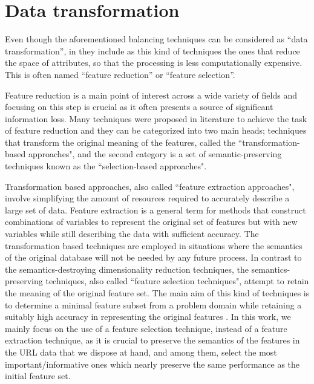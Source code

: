 \section{Data transformation}

Even though the aforementioned balancing techniques can be considered as ``data transformation'', in \cite{fayyad1996data} they include as this kind of techniques the ones that reduce the space of attributes, so that the processing is less computationally expensive. This is often named ``feature reduction'' or ``feature selection''.

Feature reduction is a main point of interest across a wide variety of fields and focusing on this step is crucial as it often presents a source of significant information loss. Many techniques were proposed in literature to achieve the task of feature reduction and they can be categorized into two main heads; techniques that transform the original meaning of the features, called the ``transformation-based approaches", and the second category is a set of semantic-preserving techniques known as the ``selection-based approaches".

Transformation based approaches, also called ``feature extraction approaches", involve simplifying the amount of resources required to accurately describe a large set of data. Feature extraction is a general term for methods that construct combinations of variables to represent the original set of features but with new variables while still describing the data with sufficient accuracy. The transformation based techniques are employed in situations where the semantics of the original database will not be needed by any future process. In contrast to the semantics-destroying dimensionality reduction techniques, the semantics-preserving techniques, also called ``feature selection techniques", attempt to retain the meaning of the original
feature set. The main aim of this kind of techniques is to determine a minimal feature subset from a problem domain while retaining a suitably high accuracy in representing the original features \cite{liu1998feature}. In this work, we mainly focus on the use of a feature selection technique, instead of a feature extraction technique, as it is crucial to preserve the semantics of the features in the URL data that we dispose at hand, and among them, select the most important/informative ones which nearly preserve  the same performance as the initial feature set.

